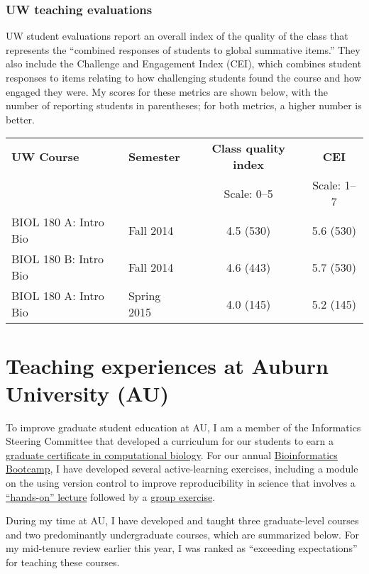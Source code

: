 \subsubsection*{UW teaching evaluations}
UW student evaluations report an overall index of the quality of the class that
represents the ``combined responses of students to global summative items.''
They also include the Challenge and Engagement Index (CEI), which combines
student responses to items relating to how challenging students found the
course and how engaged they were.
My scores for these metrics are shown below, with the number of reporting
students in parentheses;
for both metrics, a higher number is better.
\begin{center}
\begin{tabular}{l l c c}
    \hline
    \textbf{UW Course} & \textbf{Semester} & \textbf{Class quality index} & \textbf{CEI} \\
                       &                   & Scale: 0--5                  & Scale: 1--7 \\
    \hline
    BIOL 180 A: Intro Bio & Fall 2014 & 4.5 (530) & 5.6 (530) \\
    BIOL 180 B: Intro Bio & Fall 2014 & 4.6 (443) & 5.7 (530) \\
    BIOL 180 A: Intro Bio & Spring 2015 & 4.0 (145) & 5.2 (145) \\
    \hline
\end{tabular}
\end{center}

\section*{Teaching experiences at Auburn University (AU)}
To improve graduate student education at AU,
I am a member of the Informatics Steering Committee that developed a
curriculum for our students to earn a
\href{http://bulletin.auburn.edu/thegraduateschool/graduatedegreesoffered/biologicalsciencesmsphd_major/computationalbiology_gradcert/}{graduate certificate in computational biology}.
For our annual
\href{http://www.auburn.edu/cosam/bioinformatics/}{Bioinformatics Bootcamp},
I have developed several active-learning exercises,
including a module on the using version control to improve reproducibility in
science that involves a
\href{http://phyletica.org/slides/git-intro/}{``hands-on'' lecture}
followed by a
\href{https://github.com/joaks1/au-bootcamp-git-intro}{group exercise}.

During my time at AU,
I have developed and taught three graduate-level courses
and two predominantly undergraduate courses,
which are summarized below.
For my mid-tenure review earlier this year, I was ranked as ``exceeding
expectations'' for teaching these courses.

